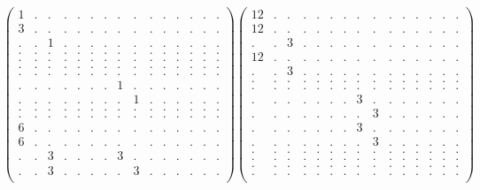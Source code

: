 \documentclass[12pt,a4paper]{amsart}
\begin{document}
\begin{align*}
\left(\begin{array}{rrrrrrrrrrrrrrr}%
1&.&.&.&.&.&.&.&.&.&.&.&.&.&.\\%
3&.&.&.&.&.&.&.&.&.&.&.&.&.&.\\%
.&.&1&.&.&.&.&.&.&.&.&.&.&.&.\\%
.&.&.&.&.&.&.&.&.&.&.&.&.&.&.\\%
.&.&.&.&.&.&.&.&.&.&.&.&.&.&.\\%
.&.&.&.&.&.&.&.&.&.&.&.&.&.&.\\%
.&.&.&.&.&.&.&.&.&.&.&.&.&.&.\\%
.&.&.&.&.&.&.&1&.&.&.&.&.&.&.\\%
.&.&.&.&.&.&.&.&1&.&.&.&.&.&.\\%
.&.&.&.&.&.&.&.&.&.&.&.&.&.&.\\%
.&.&.&.&.&.&.&.&.&.&.&.&.&.&.\\%
6&.&.&.&.&.&.&.&.&.&.&.&.&.&.\\%
6&.&.&.&.&.&.&.&.&.&.&.&.&.&.\\%
.&.&3&.&.&.&.&3&.&.&.&.&.&.&.\\%
.&.&3&.&.&.&.&.&3&.&.&.&.&.&.\\%
\end{array}\right)%
\left(\begin{array}{rrrrrrrrrrrrrrr}%
12&.&.&.&.&.&.&.&.&.&.&.&.&.&.\\%
12&.&.&.&.&.&.&.&.&.&.&.&.&.&.\\%
.&.&3&.&.&.&.&.&.&.&.&.&.&.&.\\%
12&.&.&.&.&.&.&.&.&.&.&.&.&.&.\\%
.&.&3&.&.&.&.&.&.&.&.&.&.&.&.\\%
.&.&.&.&.&.&.&.&.&.&.&.&.&.&.\\%
.&.&.&.&.&.&.&.&.&.&.&.&.&.&.\\%
.&.&.&.&.&.&.&3&.&.&.&.&.&.&.\\%
.&.&.&.&.&.&.&.&3&.&.&.&.&.&.\\%
.&.&.&.&.&.&.&3&.&.&.&.&.&.&.\\%
.&.&.&.&.&.&.&.&3&.&.&.&.&.&.\\%
.&.&.&.&.&.&.&.&.&.&.&.&.&.&.\\%
.&.&.&.&.&.&.&.&.&.&.&.&.&.&.\\%
.&.&.&.&.&.&.&.&.&.&.&.&.&.&.\\%
.&.&.&.&.&.&.&.&.&.&.&.&.&.&.\\%
\end{array}\right)%
\end{align*}
\end{document}
